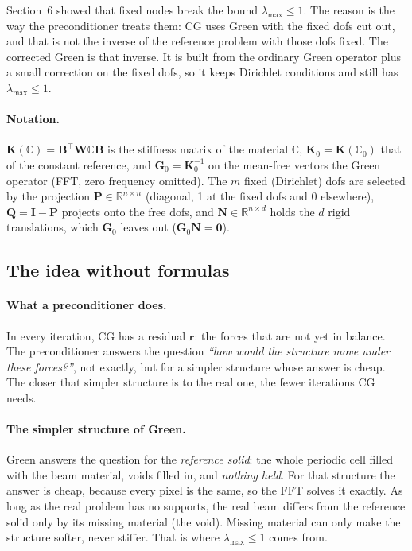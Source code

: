 \documentclass[11pt,a4paper]{article}
\begin{document}
Section~6 showed that fixed nodes break the bound $\lambda_{\max} \le 1$. The reason is the way the preconditioner
treats them: CG uses Green with the fixed dofs cut out, and that is not the inverse of the reference problem with
those dofs fixed. The corrected Green is that inverse. It is built from the ordinary Green operator plus a small
correction on the fixed dofs, so it keeps Dirichlet conditions and still has $\lambda_{\max} \le 1$.

\paragraph{Notation.} $\mathbf{K}(\mathbb{C}) = \mathbf{B}^{\top}\mathbf{W}\mathbb{C}\mathbf{B}$ is the stiffness matrix of
the material $\mathbb{C}$, $\mathbf{K}_0 = \mathbf{K}(\mathbb{C}_0)$ that of the constant reference, and
$\mathbf{G}_0 = \mathbf{K}_0^{-1}$ on the mean-free vectors the Green operator (FFT, zero frequency omitted). The $m$
fixed (Dirichlet) dofs are selected by the projection $\mathbf{P} \in \mathbb{R}^{n\times n}$ (diagonal, 1 at the fixed
dofs and 0 elsewhere), $\mathbf{Q} = \mathbf{I} - \mathbf{P}$ projects onto the free dofs, and $\mathbf{N} \in \mathbb{R}^{n\times d}$ holds the $d$ rigid
translations, which $\mathbf{G}_0$ leaves out ($\mathbf{G}_0\mathbf{N} = \mathbf{0}$).

\subsection*{The idea without formulas}

\paragraph{What a preconditioner does.} In every iteration, CG has a residual $\mathbf{r}$: the forces that are not yet in
balance. The preconditioner answers the question \emph{``how would the structure move under these forces?''}, not
exactly, but for a simpler structure whose answer is cheap. The closer that simpler structure is to the real one, the
fewer iterations CG needs.

\paragraph{The simpler structure of Green.} Green answers the question for the \emph{reference solid}: the whole periodic
cell filled with the beam material, voids filled in, and \emph{nothing held}. For that structure the answer is cheap,
because every pixel is the same, so the FFT solves it exactly. As long as the real problem has no supports, the real
beam differs from the reference solid only by its missing material (the void). Missing material can only make the
structure softer, never stiffer. That is where $\lambda_{\max} \le 1$ comes from.
\end{document}
